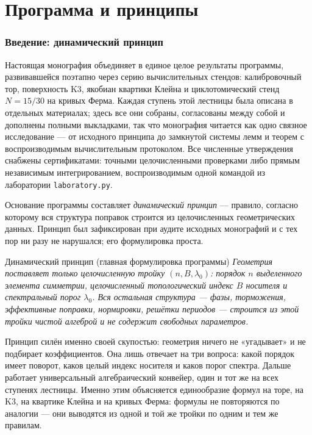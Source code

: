 \part{Программа и принципы}

\section{Введение: динамический принцип}\label{sec:intro}

Настоящая монография объединяет в единое целое результаты программы,
развивавшейся поэтапно через серию вычислительных стендов: калибровочный
тор, поверхность K3, якобиан квартики Клейна и циклотомический стенд
$N=15/30$ на кривых Ферма. Каждая ступень этой лестницы была описана в
отдельных материалах; здесь все они собраны, согласованы между собой и
дополнены полными выкладками, так что монография читается как одно
связное исследование — от исходного принципа до замкнутой системы
лемм и теорем с воспроизводимым вычислительным протоколом. Все
численные утверждения снабжены сертификатами: точными целочисленными
проверками либо прямым независимым интегрированием, воспроизводимым
одной командой из лаборатории \texttt{laboratory.py}.

Основание программы составляет \emph{динамический принцип} — правило,
согласно которому вся структура поправок строится из целочисленных
геометрических данных. Принцип был зафиксирован при аудите исходных
монографий и с тех пор ни разу не нарушался; его формулировка проста.

\begin{keybox}{Динамический принцип (главная формулировка программы)}
\emph{Геометрия поставляет только целочисленную тройку
$(n, B, \lambda_0)$: порядок $n$ выделенного элемента симметрии,
целочисленный топологический индекс $B$ носителя и спектральный порог
$\lambda_0$. Вся остальная структура — фазы, торможения, эффективные
поправки, нормировки, решётки периодов — строится из этой тройки
чистой алгеброй и не содержит свободных параметров.}
\end{keybox}

Принцип силён именно своей скупостью: геометрия ничего не «угадывает»
и не подбирает коэффициентов. Она лишь отвечает на три вопроса:
какой порядок имеет поворот, каков целый индекс носителя и каков порог
спектра. Дальше работает универсальный алгебраический конвейер, один и
тот же на всех ступенях лестницы. Именно этим объясняется единообразие
формул на торе, на K3, на квартике Клейна и на кривых Ферма: формулы
не повторяются по аналогии — они выводятся из одной и той же тройки
по одним и тем же правилам.

